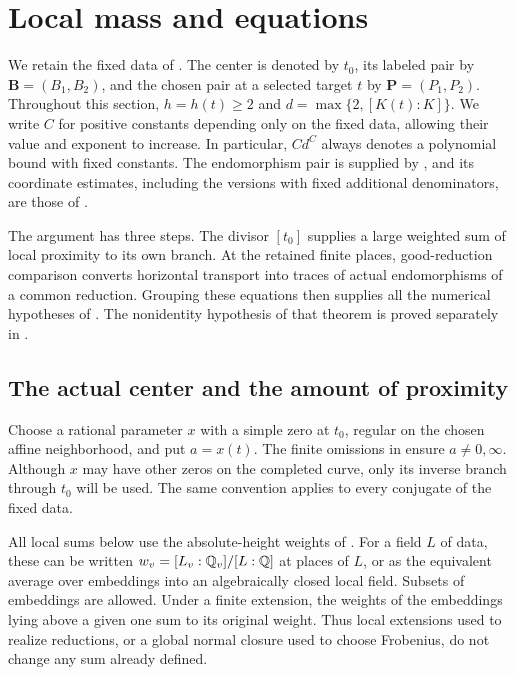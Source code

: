 \section{Local mass and equations}\label{loc:section}

We retain the fixed data of .
The center is denoted by $t_0$, its labeled pair by
$\mathbf B=(B_1,B_2)$, and the chosen pair at a selected target $t$ by
$\mathbf P=(P_1,P_2)$.  Throughout this section, $h=h(t)\geq2$ and
$d=\max\{2,[K(t):K]\}$.  We write $C$ for positive constants depending
only on the fixed data, allowing their value and exponent to increase.
In particular, $Cd^C$ always denotes a polynomial bound with fixed
constants.  The endomorphism pair is supplied by
, and its coordinate estimates, including the
versions with fixed additional denominators, are those of
.

The argument has three steps.  The divisor $[t_0]$ supplies a large
weighted sum of local proximity to its own branch.  At the retained
finite places, good-reduction comparison converts horizontal transport
into traces of actual endomorphisms of a common reduction.  Grouping
these equations then supplies all the numerical hypotheses of
.  The nonidentity hypothesis of that theorem is proved
separately in .

\subsection{The actual center and the amount of proximity}

Choose a rational parameter $x$ with a simple zero at $t_0$, regular on
the chosen affine neighborhood, and put $a=x(t)$.  The finite omissions
in  ensure $a\ne0,\infty$.  Although $x$
may have other zeros on the completed curve, only its inverse branch
through $t_0$ will be used.  The same convention applies to every
conjugate of the fixed data.

All local sums below use the absolute-height weights of
.  For a field $L$ of data, these can be written
$w_v=[L_v:\mathbb Q_v]/[L:\mathbb Q]$ at places of $L$, or as the equivalent average
over embeddings into an algebraically closed local field.  Subsets of
embeddings are allowed.  Under a finite extension, the weights of the
embeddings lying above a given one sum to its original weight.  Thus
local extensions used to realize reductions, or a global normal closure
used to choose Frobenius, do not change any sum already defined.

